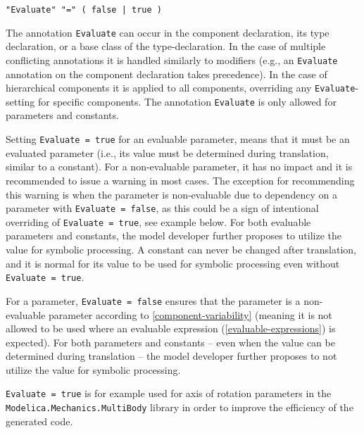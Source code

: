 \begin{annotationdefinition}[Evaluate]
\begin{synopsis}[grammar]\begin{lstlisting}
"Evaluate" "=" ( false | true )
\end{lstlisting}\end{synopsis}
\begin{semantics}
The annotation \lstinline!Evaluate! can occur in the component declaration, its type declaration, or a base class of the type-declaration.
In the case of multiple conflicting annotations it is handled similarly to modifiers (e.g., an \lstinline!Evaluate! annotation on the component declaration takes precedence).
In the case of hierarchical components it is applied to all components, overriding any \lstinline!Evaluate!-setting for specific components.
The annotation \lstinline!Evaluate! is only allowed for parameters and constants.

Setting \lstinline!Evaluate = true! for an evaluable parameter, means that it must be an evaluated parameter (i.e., its value must be determined during translation, similar to a constant).
For a non-evaluable parameter, it has no impact and it is recommended to issue a warning in most cases.
The exception for recommending this warning is when the parameter is non-evaluable due to dependency on a parameter with \lstinline!Evaluate = false!, as this could be a sign of intentional overriding of \lstinline!Evaluate = true!, see example below.
For both evaluable parameters and constants, the model developer further proposes to utilize the value for symbolic processing.
A constant can never be changed after translation, and it is normal for its value to be used for symbolic processing even without \lstinline!Evaluate = true!.

For a parameter, \lstinline!Evaluate = false! ensures that the parameter is a non-evaluable parameter according to \cref{component-variability} (meaning it is not allowed to be used where an evaluable expression (\cref{evaluable-expressions}) is expected).
For both parameters and constants -- even when the value can be determined during translation -- the model developer further proposes to not utilize the value for symbolic processing.

\begin{nonnormative}
\lstinline!Evaluate = true! is for example used for axis of rotation parameters in the \lstinline!Modelica.Mechanics.MultiBody! library in order to improve the efficiency of the generated code.


\end{nonnormative}
\end{semantics}
\end{annotationdefinition}
